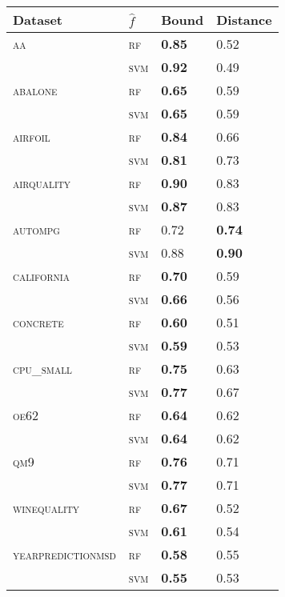 \begin{tabular}{llll}
  \toprule
Dataset & $\hat f$ & Bound & Distance \\ 
  \midrule
\textsc{aa} & \textsc{rf} & \textbf{0.85} & 0.52 \\ 
   & \textsc{svm} & \textbf{0.92} & 0.49 \\ 
  \textsc{abalone} & \textsc{rf} & \textbf{0.65} & 0.59 \\ 
   & \textsc{svm} & \textbf{0.65} & 0.59 \\ 
  \textsc{airfoil} & \textsc{rf} & \textbf{0.84} & 0.66 \\ 
   & \textsc{svm} & \textbf{0.81} & 0.73 \\ 
  \textsc{airquality} & \textsc{rf} & \textbf{0.90} & 0.83 \\ 
   & \textsc{svm} & \textbf{0.87} & 0.83 \\ 
  \textsc{autompg} & \textsc{rf} & 0.72 & \textbf{0.74} \\ 
   & \textsc{svm} & 0.88 & \textbf{0.90} \\ 
  \textsc{california} & \textsc{rf} & \textbf{0.70} & 0.59 \\ 
   & \textsc{svm} & \textbf{0.66} & 0.56 \\ 
  \textsc{concrete} & \textsc{rf} & \textbf{0.60} & 0.51 \\ 
   & \textsc{svm} & \textbf{0.59} & 0.53 \\ 
  \textsc{cpu\_small} & \textsc{rf} & \textbf{0.75} & 0.63 \\ 
   & \textsc{svm} & \textbf{0.77} & 0.67 \\ 
  \textsc{oe62} & \textsc{rf} & \textbf{0.64} & 0.62 \\ 
   & \textsc{svm} & \textbf{0.64} & 0.62 \\ 
  \textsc{qm9} & \textsc{rf} & \textbf{0.76} & 0.71 \\ 
   & \textsc{svm} & \textbf{0.77} & 0.71 \\ 
  \textsc{winequality} & \textsc{rf} & \textbf{0.67} & 0.52 \\ 
   & \textsc{svm} & \textbf{0.61} & 0.54 \\ 
  \textsc{yearpredictionmsd} & \textsc{rf} & \textbf{0.58} & 0.55 \\ 
   & \textsc{svm} & \textbf{0.55} & 0.53 \\ 
   \bottomrule
\end{tabular}
